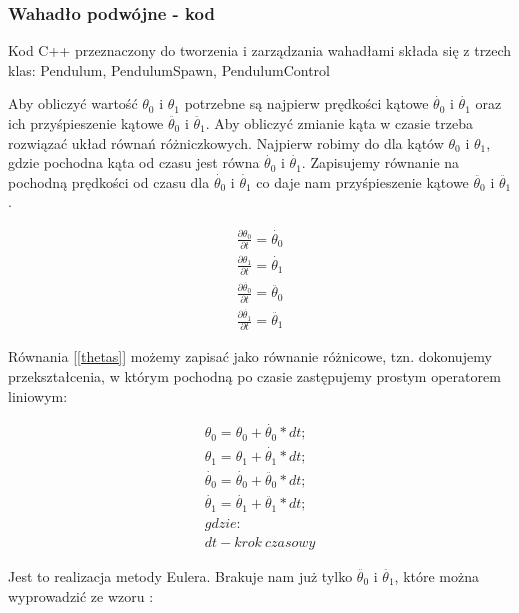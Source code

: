 \documentclass[a4paper,12pt,reqno]{article}
\begin{document}
\subsubsection{Wahadło podwójne - kod}


Kod C++ przeznaczony do tworzenia i zarządzania wahadłami składa się z trzech klas: Pendulum, PendulumSpawn, PendulumControl

Aby obliczyć wartość $\theta_0$ i $\theta_1$ potrzebne są najpierw prędkości kątowe  $\dot{\theta_0}$ i $\dot{\theta_1}$ oraz ich przyśpieszenie kątowe $\ddot{\theta_0}$ i $\ddot{\theta_1}$. Aby obliczyć zmianie kąta w czasie trzeba rozwiązać układ równań różniczkowych. Najpierw robimy do dla kątów  $\theta_0$ i $\theta_1$, gdzie pochodna kąta od czasu jest równa $\dot{\theta_0}$ i $\dot{\theta_1}$. Zapisujemy równanie na pochodną prędkości od czasu dla $\dot{\theta_0}$ i $\dot{\theta_1}$ co daje nam przyśpieszenie kątowe $\ddot{\theta_0}$ i $\ddot{\theta_1}$.

\begin{equation}
\begin{split} 
\frac{\partial\theta_0}{\partial t}=\dot{\theta_0}
\\
\frac{\partial\theta_1}{\partial t}=\dot{\theta_1}
\\
\frac{\partial\dot{\theta_0}}{\partial t}=\ddot{\theta_0}
\\
\frac{\partial\dot{\theta_1}}{\partial t}=\ddot{\theta_1}
\end{split}
\label{thetas}
\end{equation}

Równania [\ref{thetas}] możemy zapisać jako równanie różnicowe, tzn. dokonujemy przekształcenia, w którym pochodną po czasie zastępujemy prostym operatorem liniowym:

\begin{equation}
\begin{split} 
\theta_0=\theta_0+\dot{\theta_0}*dt;
\\
\theta_1=\theta_1+\dot{\theta_1}*dt;
\\
\dot{\theta_0}=\dot{\theta_0}+\ddot{\theta_0}*dt;
\\
\dot{\theta_1}=\dot{\theta_1}+\ddot{\theta_1}*dt;
\\
gdzie:
\\
dt-krok\ czasowy
\end{split}
\label{pendumalgeb}
\end{equation}

Jest to realizacja metody Eulera. Brakuje nam już tylko $\ddot{\theta_0}$ i $\ddot{\theta_1}$, które można wyprowadzić ze wzoru \cite{double_pendulum}: 
\end{document}
